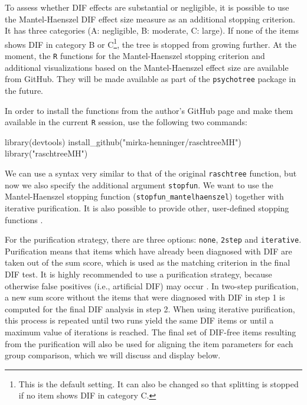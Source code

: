 \documentclass[doc,floatsintext,natbib]{apa7}
\begin{document}
To assess whether DIF effects are substantial or negligible, it is possible to use the Mantel-Haenszel DIF effect size measure as an additional stopping criterion. It has three categories (A: negligible, B: moderate, C: large). If none of the items shows DIF in category B or C\footnote{This is the default setting. It can also be changed so that splitting is stopped if no item shows DIF in category C.}, the tree is stopped from growing further.
At the moment, the \texttt{R} functions for the Mantel-Haenszel stopping criterion and additional visualizations based on the Mantel-Haenszel effect size are available from GitHub. They will be made available as part of the \texttt{psychotree} package in the future.

In order to install the functions from the author's GitHub page and make them available in the current \texttt{R} session, use the following two commands:

\begin{Schunk}
\begin{Sinput}
 library(devtools)
 install_github("mirka-henninger/raschtreeMH")
 library("raschtreeMH")
\end{Sinput}
\end{Schunk}

We can use a syntax very similar to that of the original \texttt{raschtree} function, but now we also specify the additional argument \texttt{stopfun}. We want to use the Mantel-Haenszel stopping function (\texttt{stopfun\_mantelhaenszel}) together with iterative purification. It is also possible to provide other, user-defined stopping functions \citep[see][for details]{HennyDeba23}.

For the purification strategy, there are three options: \texttt{none}, \texttt{2step} and \texttt{iterative}. Purification means that items which have already been diagnosed with DIF are taken out of the sum score, which is used as the matching criterion in the final DIF test. It is highly recommended to use a purification strategy, because otherwise false positives (i.e., artificial DIF) may occur \citep[cf., e.g.,][and the references therein]{DebStrZei:2022:CRC,HennyDeba23,Kopfetal:2015:EPM}. In two-step purification, a new sum score without the items that were diagnosed with DIF in step 1 is computed for the final DIF analysis in step 2. When using iterative purification, this process is repeated until two runs yield the same DIF items or until a maximum value of iterations is reached. 
The final set of DIF-free items resulting from the purification will also be used for aligning the item parameters for each group comparison, which we will discuss and display below.
\end{document}
